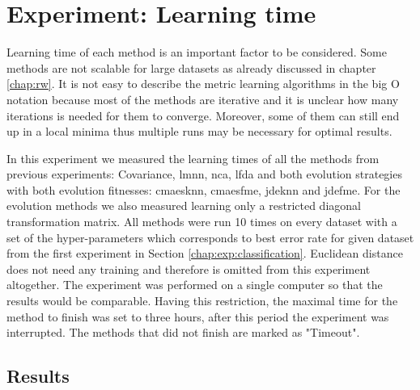 \documentclass[12pt,a4paper]{report}
\begin{document}
\section{Experiment: Learning time} \label{chap:exp:learning-times}

Learning time of each method is an important factor to be considered. Some methods are not scalable for large datasets as already discussed in chapter \ref{chap:rw}. It is not easy to describe the metric learning algorithms in the big O notation because most of the methods are iterative and it is unclear how many iterations is needed for them to converge. Moreover, some of them can still end up in a local minima thus multiple runs may be necessary for optimal results.

In this experiment we measured the learning times of all the methods from previous experiments: Covariance, \ac{lmnn}, \ac{nca}, \ac{lfda} and both evolution strategies with both evolution fitnesses: \ac{cmaesknn}, \ac{cmaesfme}, \ac{jdeknn} and \ac{jdefme}. For the evolution methods we also measured learning only a restricted diagonal transformation matrix. All methods were run 10 times on every dataset with a set of the hyper-parameters which corresponds to best error rate for given dataset from the first experiment in Section \ref{chap:exp:classification}. Euclidean distance does not need any training and therefore is omitted from this experiment altogether. The experiment was performed on a single computer so that the results would be comparable. Having this restriction, the maximal time for the method to finish was set to three hours, after this period the experiment was interrupted. The methods that did not finish are marked as "Timeout".

\subsection{Results}
\end{document}
